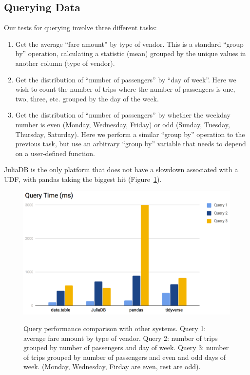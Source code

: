 \documentclass{juliacon}
\begin{document}
\subsection{Querying Data}

Our tests for querying involve three different tasks: 
\begin{enumerate}
\item Get the average “fare amount” by type of vendor. This is a standard
“group by” operation, calculating a statistic (mean) grouped by the
unique values in another column (type of vendor). 
\item Get the distribution of “number of passengers” by “day of week”. Here
we wish to count the number of trips where the number of passengers
is one, two, three, etc. grouped by the day of the week. 
\item Get the distribution of “number of passengers” by whether the weekday
number is even (Monday, Wednesday, Friday) or odd (Sunday, Tuesday,
Thursday, Saturday). Here we perform a similar “group by” operation
to the previous task, but use an arbitrary “group by” variable that
needs to depend on a user-defined function. 
\end{enumerate}
JuliaDB is the only platform that does not have a slowdown associated
with a UDF, with pandas taking the biggest hit (Figure~\ref{fig:nyctaxiquery}).

\begin{figure}[h]
    \centering \includegraphics[width=5in]{image4.png}
    \label{fig:nyctaxiquery} 
    \caption{Query performance comparison with other systems. Query 1: average fare amount by type of vendor. Query 2: number of trips grouped by number of passengers and day of week. Query 3: number of trips grouped by number of passengers and even and odd days of week. (Monday, Wednesday, Firday are even, rest are odd).}
\end{figure}
\end{document}
